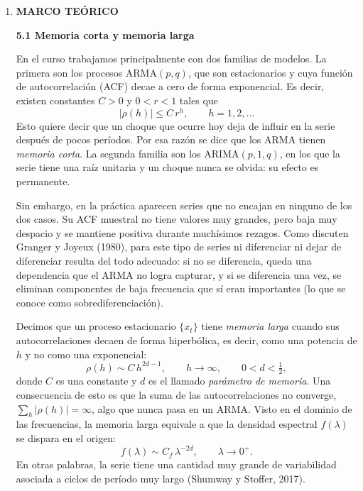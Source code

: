 \documentclass[legalpaper,11pt]{article}
\begin{document}
\begin{enumerate}
El documento est\'a organizado as\'i: en la secci\'on 5 se presenta el marco te\'orico, en las secciones 6 y 7 los objetivos y la metodolog\'ia, en la secci\'on 8 la aplicaci\'on a la serie del Nilo y en la secci\'on 9 las conclusiones, donde se confrontan los resultados con la teor\'ia y se discuten las ventajas y desventajas del modelo.
\medskip

\item \textbf{MARCO TE{\'O}RICO}

\medskip
\noindent\textbf{5.1 Memoria corta y memoria larga}

En el curso trabajamos principalmente con dos familias de modelos. La primera son los procesos ARMA$(p,q)$, que son estacionarios y cuya funci\'on de autocorrelaci\'on (ACF) decae a cero de forma exponencial. Es decir, existen constantes $C>0$ y $0<r<1$ tales que
\begin{equation}
|\rho(h)| \le C\, r^{h}, \qquad h = 1, 2, \ldots
\end{equation}
Esto quiere decir que un choque que ocurre hoy deja de influir en la serie despu\'es de pocos per\'iodos. Por esa raz\'on se dice que los ARMA tienen \emph{memoria corta}. La segunda familia son los ARIMA$(p,1,q)$, en los que la serie tiene una ra\'iz unitaria y un choque nunca se olvida: su efecto es permanente.

Sin embargo, en la pr\'actica aparecen series que no encajan en ninguno de los dos casos. Su ACF muestral no tiene valores muy grandes, pero baja muy despacio y se mantiene positiva durante much\'isimos rezagos. Como discuten Granger y Joyeux (1980), para este tipo de series ni diferenciar ni dejar de diferenciar resulta del todo adecuado: si no se diferencia, queda una dependencia que el ARMA no logra capturar, y si se diferencia una vez, se eliminan componentes de baja frecuencia que s\'i eran importantes (lo que se conoce como sobrediferenciaci\'on).

Decimos que un proceso estacionario $\{x_t\}$ tiene \emph{memoria larga} cuando sus autocorrelaciones decaen de forma hiperb\'olica, es decir, como una potencia de $h$ y no como una exponencial:
\begin{equation}
\rho(h) \sim C\, h^{2d-1}, \qquad h \to \infty, \qquad 0 < d < \tfrac{1}{2},
\end{equation}
donde $C$ es una constante y $d$ es el llamado \emph{par\'ametro de memoria}. Una consecuencia de esto es que la suma de las autocorrelaciones no converge, $\sum_{h} |\rho(h)| = \infty$, algo que nunca pasa en un ARMA. Visto en el dominio de las frecuencias, la memoria larga equivale a que la densidad espectral $f(\lambda)$ se dispara en el origen:
\begin{equation}
f(\lambda) \sim C_f\, \lambda^{-2d}, \qquad \lambda \to 0^{+}.
\end{equation}
En otras palabras, la serie tiene una cantidad muy grande de variabilidad asociada a ciclos de per\'iodo muy largo (Shumway y Stoffer, 2017).


\end{enumerate}
\end{document}
